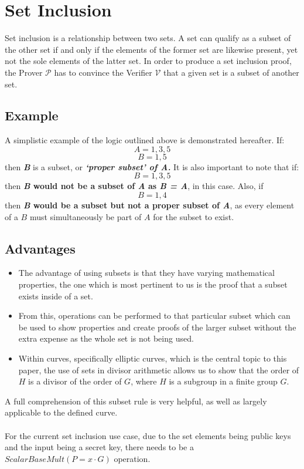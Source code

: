\documentclass{article}
\begin{document}
\section{Set Inclusion}
Set inclusion is a relationship between two sets. A set can qualify as a subset of the other set if and only if the elements of the former set are likewise present, yet not the sole elements of the latter set. In order to produce a set inclusion proof, the Prover $\mathcal{P}$ has to convince the Verifier $\mathcal{V}$ that a given set is a subset of another set.
\subsection{Example}
A simplistic example of the logic outlined above is demonstrated hereafter. If:  $$ A={1,3,5} $$
$$ B={1,5} $$ then \textbf{\textit{B}} is a subset, or \textbf{\textit{‘proper subset’ of A.}} 
It is also important to note that if: $$ B={1,3,5} $$ then \textbf{\textit{B} would not be a subset of \textit{A} as \textit{B = A}}, in this case. Also, if $$ B={1,4} $$ then \textbf{\textit{B} would be a subset but not a proper subset of \textit{A}}, as every element of a $B$ must simultaneously be part of $A$ for the subset to exist.
\subsection{Advantages}
\begin{itemize}
    \item The advantage of using subsets is that they have varying mathematical properties, the one which is most pertinent to us is the proof that a subset exists inside of a set.
    \item From this, operations can be performed to that particular subset which can be used to show properties and create proofs of the larger subset without the extra expense as the whole set is not being used.
    \item Within curves, specifically elliptic curves, which is the central topic to this paper, the use of sets in divisor arithmetic allows us to show that the order of $H$ is a divisor of the order of $G$, where $H$ is a subgroup in a finite group $G$.
\end{itemize}
A full comprehension of this subset rule is very helpful, as well as largely applicable to the defined curve. \\\\
For the current set inclusion use case, due to the set elements being public keys and the input being a secret key, there needs to be a $ScalarBaseMult (P=x\cdot G)$ operation.
\end{document}

